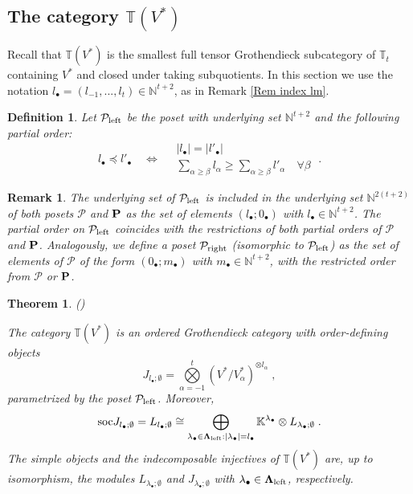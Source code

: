 \documentclass[12pt]{article}
\def\KK {{\mathbb K}}     %
\def\NN {{\mathbb N}}     %
\def\TT {{\mathbb T}}     %
\def\mc {\mathcal}
\def\tst {\Longleftrightarrow}
\newtheorem{theorem}{Theorem}[section]
\newtheorem{rem}{Remark}[section]
\newtheorem{definition}{Definition}[section]
\begin{document}
\subsection{The category $\TT(V^*)$}

Recall that $\TT(V^*)$ is the smallest full tensor Grothendieck subcategory of $\TT_t$ containing $V^*$ and closed under taking subquotients. In this section we use the notation $l_\bullet=(l_{-1},...,l_{t})\in\NN^{t+2}$, as in Remark \ref{Rem index lm}.

\begin{definition}\label{Def Poset n}
Let $\mc P_{\rm left}$ be the poset with underlying set $\NN^{t+2}$ and the following partial order:
$$
l_\bullet\preceq l'_\bullet \quad \tst \quad \begin{array}{|l} |l_\bullet|=|l'_\bullet| \\ \sum_{\alpha\geq\beta} l_\alpha \geq\sum_{\alpha\geq\beta} l'_\alpha \quad \forall \beta \end{array}\;.
$$
\end{definition}

\begin{rem}
The underlying set of $\mc P_{\rm left}$ is included in the underlying set $\NN^{2(t+2)}$ of both posets $\mc P$ and ${\bf P}$ as the set of elements $(l_\bullet;0_\bullet)$ with $l_\bullet\in\NN^{t+2}$. The partial order on $\mc P_{\rm left}$ coincides with the restrictions of both  partial orders of $\mc P$ and ${\bf P}$. Analogously, we define a poset $\mc P_{\rm right}$ (isomorphic to $\mc P_{\rm left}$) as the set of elements of $\mc P$ of the form $(0_\bullet;m_\bullet)$ with $m_\bullet\in\NN^{t+2}$, with the restricted order from $\mc P$ or ${\bf P}$.
\end{rem}

\begin{theorem} (\cite[\S~4.2]{Chirvasitu-Penkov-RC})

The category $\TT(V^*)$ is an ordered Grothendieck category with order-defining objects
$$
J_{l_\bullet;\emptyset} = \bigotimes\limits_{\alpha=-1}^t (V^*/V^*_\alpha)^{\otimes l_\alpha}\;,
$$
parametrized by the poset $\mc P_{\rm left}$. Moreover,
$$
{\rm soc}J_{l_\bullet;\emptyset} = L_{l_\bullet;\emptyset} \cong \bigoplus\limits_{\lambda_\bullet\in\bm\Lambda_{\rm left}:|\lambda_\bullet|=l_\bullet} \KK^{\lambda_\bullet}\otimes L_{\lambda_\bullet;\emptyset} \;.
$$
The simple objects and the indecomposable injectives of $\TT(V^*)$ are, up to isomorphism, the modules $L_{\lambda_\bullet;\emptyset}$ and $J_{\lambda_\bullet;\emptyset}$ with $\lambda_\bullet\in\bm\Lambda_{\rm left}$, respectively.
\end{theorem}
\end{document}
